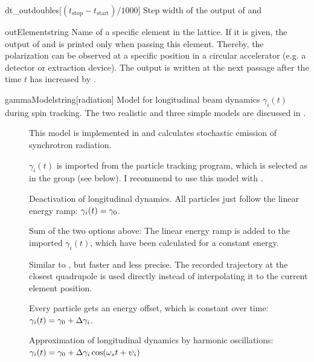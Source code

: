 \documentclass[a4paper]{scrartcl}
\begin{document}
\begin{configdoc}{dt_out}{double}{\si{\s}}[$(t_\text{stop}-t_\text{start})/1000$]
  Step width of the output of \pvec and \svec[i]
\end{configdoc}

\begin{configdoc}{outElement}{string}{}
  Name of a specific element in the lattice. If it is given, the output of \pvec and
  \svec[i] is printed only when passing this element. Thereby, the polarization can be
  observed at a specific position in a circular accelerator (e.g. a detector or extraction
  device). The output is written at the next passage after the time $t$ has increased by
  .
\end{configdoc}

\begin{configdoc}{gammaModel}{string}{}[radiation]
  Model for longitudinal beam dynamics $\gamma_i(t)$ during spin tracking. The two
  realistic and three simple models are discussed in \cite[chapter~4]{dr}.
  \begin{description}
  \item[] This model is implemented in \polem and calculates
    stochastic emission of synchrotron radiation.
  \item[] $\gamma_i(t)$ is imported from the particle tracking program,
    which is selected as  in the group  (see below).
    I recommend to use this model with \ele.
  \item[] Deactivation of longitudinal dynamics. All particles just
    follow the linear energy ramp: $\gamma_i(t) = \gamma_0$.
  \item[] Sum of the two options above: The linear energy ramp
    is added to the imported $\gamma_i(t)$, which have been calculated for a constant
    energy.
  \item[] Similar to , but faster
    and less precise. The recorded trajectory at the closest quadrupole is used directly
    instead of interpolating it to the current element position.
  \item[] Every particle gets an energy offset, which is constant over
    time: $\gamma_i(t) = \gamma_0 + \Delta\gamma_i$.
  \item[] Approximation of longitudinal dynamics by harmonic
    oscillations:\\$\gamma_i(t) = \gamma_0 + \Delta\gamma_i \cos(\omega_s t + \psi_i)$
  \end{description}
\end{configdoc}
\end{document}

